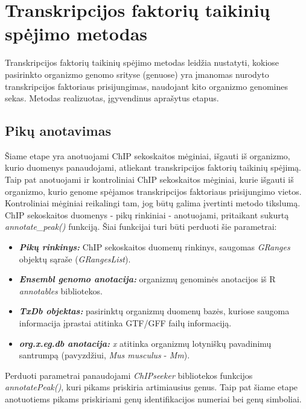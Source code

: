 \documentclass[12pt]{article}
\begin{document}
\newpage


\section{Transkripcijos faktorių taikinių spėjimo metodas}
Transkripcijos faktorių taikinių spėjimo metodas leidžia nustatyti, kokiose
pasirinkto organizmo genomo srityse (genuose) yra įmanomas nurodyto
transkripcijos faktoriaus prisijungimas, naudojant kito organizmo genomines
sekas. Metodas realizuotas, įgyvendinus aprašytus etapus.

\subsection{Pikų anotavimas}
Šiame etape yra anotuojami ChIP sekoskaitos mėginiai, išgauti iš organizmo,
kurio duomenys panaudojami, atliekant transkripcijos faktorių taikinių spėjimą.
Taip pat anotuojami ir kontroliniai ChIP sekoskaitos mėginiai, kurie išgauti iš
organizmo, kurio genome spėjamos transkripcijos faktoriaus prisijungimo vietos.
Kontroliniai mėginiai reikalingi tam, jog būtų galima įvertinti metodo tikslumą.
ChIP sekoskaitos duomenys - pikų rinkiniai - anotuojami, pritaikant sukurtą
\emph{annotate\_peak()} funkciją. Šiai funkcijai turi būti perduoti šie
parametrai:

\begin{itemize}
    \item \textbf{\emph{Pikų rinkinys:}} ChIP sekoskaitos duomenų rinkinys,
        saugomas \emph{GRanges} objektų sąraše (\emph{GRangesList}).
    \item \textbf{\emph{Ensembl genomo anotacija:}} organizmų genominės
        anotacijos iš R \emph{annotables} bibliotekos.
    \item \textbf{\emph{TxDb objektas:}} pasirinktų organizmų duomenų bazės,
        kuriose saugoma informacija įprastai atitinka GTF/GFF failų informaciją.
    \item \textbf{\emph{org.x.eg.db anotacija:}} \emph{x} atitinka organizmų
        lotyniškų pavadinimų santrumpą (pavyzdžiui, \emph{Mus musculus} -
        \emph{Mm}).
\end{itemize}

Perduoti parametrai panaudojami \emph{ChIPseeker}\cite{CHIPSEEKER} bibliotekos
funkcijos \emph{annotatePeak()}, kuri pikams priskiria artimiausius genus.
Taip pat šiame etape anotuotiems pikams priskiriami genų identifikacijos
numeriai bei genų simboliai.
\end{document}
